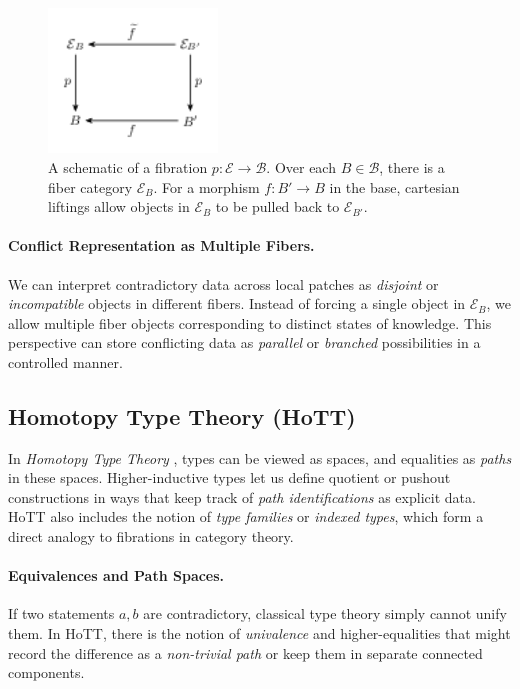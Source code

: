 \documentclass{article}
\begin{document}
\begin{figure}[ht]
\centering
\includegraphics[width=0.4\textwidth]{fibration_diagram.png}
\caption{A schematic of a fibration $p: \mathcal{E} \to \mathcal{B}$. Over each $B \in \mathcal{B}$, there is a fiber category $\mathcal{E}_B$. For a morphism $f: B' \to B$ in the base, cartesian liftings allow objects in $\mathcal{E}_B$ to be pulled back to $\mathcal{E}_{B'}$.}
\label{fig:fibration}
\end{figure}

\paragraph{Conflict Representation as Multiple Fibers.}
We can interpret contradictory data across local patches as \emph{disjoint} or \emph{incompatible} objects in different fibers. Instead of forcing a single object in $\mathcal{E}_B$, we allow multiple fiber objects corresponding to distinct states of knowledge. This perspective can store conflicting data as \emph{parallel} or \emph{branched} possibilities in a controlled manner.

\subsection{Homotopy Type Theory (HoTT)}

In \emph{Homotopy Type Theory} \citep{hottbook}, types can be viewed as spaces, and equalities as \emph{paths} in these spaces. Higher-inductive types let us define quotient or pushout constructions in ways that keep track of \emph{path identifications} as explicit data. HoTT also includes the notion of \emph{type families} or \emph{indexed types}, which form a direct analogy to fibrations in category theory.

\paragraph{Equivalences and Path Spaces.}
If two statements $a, b$ are contradictory, classical type theory simply cannot unify them. In HoTT, there is the notion of \emph{univalence} and higher-equalities that might record the difference as a \emph{non-trivial path} or keep them in separate connected components.
\end{document}
